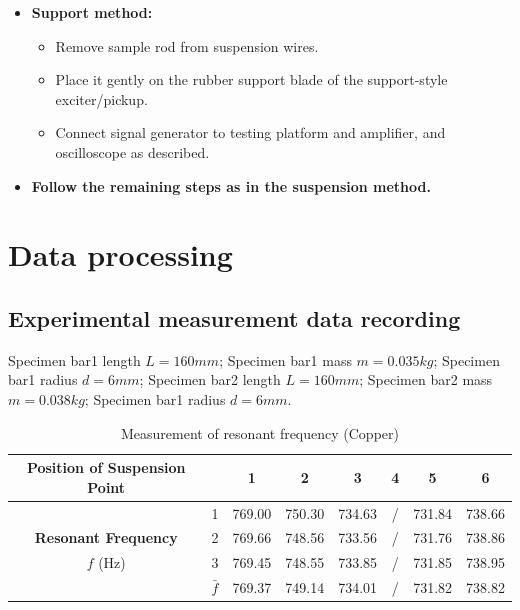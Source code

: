 \documentclass[UTF8]{article}
\begin{document}
\begin{itemize}
    \item \textbf{Support method:}
    \begin{itemize}
        \item Remove sample rod from suspension wires.
        \item Place it gently on the rubber support blade of the support-style exciter/pickup.
        \item Connect signal generator to testing platform and amplifier, and oscilloscope as described.
    \end{itemize}

    \item \textbf{Follow the remaining steps as in the suspension method.}

\end{itemize}
	
	\section{Data processing}
   \subsection{Experimental measurement data recording}
   Specimen bar1 length $L=160mm$; Specimen bar1 mass $m=0.035kg$; Specimen bar1 radius $d=6mm$; Specimen bar2 length $L=160mm$; Specimen bar2 mass $m=0.038kg$; Specimen bar1 radius $d=6mm$.
       
   \begin{table}[htbp]
       \centering
       \caption{Measurement of resonant frequency (Copper)}
       \begin{tabular}{cccccccc}
           \toprule
           \textbf{Position of Suspension Point} && \textbf{1} & \textbf{2} & \textbf{3} &\textbf{4} & \textbf{5} & \textbf{6} \\
           \midrule
                                            & 1 & 769.00 & 750.30 & 734.63 & / & 731.84 & 738.66 \\
                    \textbf{Resonant Frequency}& 2 & 769.66 & 748.56 & 733.56 & / & 731.76 &738.86\\
                              $f$ (Hz)       & 3 & 769.45 & 748.55 & 733.85 & / & 731.85 & 738.95\\
                                              &$\bar{f}$  & 769.37 & 749.14 &  734.01 &/ & 731.82 & 738.82 \\
           \bottomrule
       \end{tabular}
       \label{tab:resonant-frequencies}
   \end{table}
   
\end{document}
